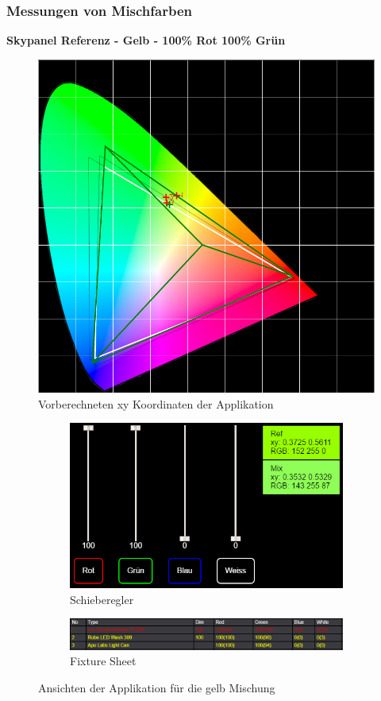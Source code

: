 \documentclass[11pt]{scrartcl}
\begin{document}
\subsubsection{Messungen von Mischfarben}
\textbf{Skypanel Referenz - Gelb - 100\% Rot 100\% Grün}
\begin{figure}[H]
    \begin{center}
        \includegraphics[width=.8\textwidth]{images/app_mix_yellow_cie.png}
    \end{center}
    \caption{Vorberechneten xy Koordinaten der Applikation}
\end{figure}
\noindent
\begin{figure}[H]
    \centering
    \begin{subfigure}[b]{.39\textwidth}
        \includegraphics[width=\textwidth]{images/app_mix_yellow_faders.png}
        \caption{Schieberegler}
    \end{subfigure}
    \hfill 
    \begin{subfigure}[b]{.59\textwidth}
        \includegraphics[width=\textwidth]{images/app_mix_yellow_fixtureSheet.png}
        \caption{Fixture Sheet}
    \end{subfigure}
    \caption{Ansichten der Applikation für die gelb Mischung}
\end{figure}
\end{document}
